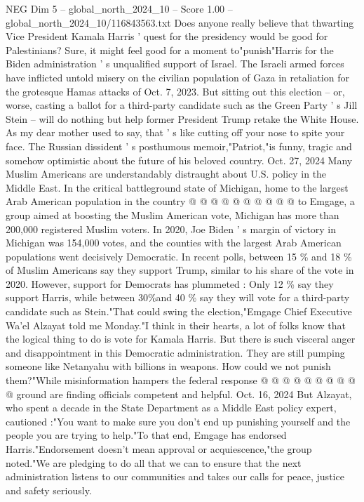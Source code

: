 \begin{textsample}{NEG Dim 5 – global\_north\_2024\_10 – Score 1.00 – global\_north\_2024\_10/116843563.txt}  \label{ex:f5_neg_046}
Does anyone really believe that thwarting Vice President Kamala Harris ' quest for the presidency would be good for Palestinians?
Sure, it might feel good for a moment to"punish"Harris for the Biden administration ' s unqualified support of Israel.
The Israeli armed forces have inflicted untold misery on the civilian population of Gaza in retaliation for the grotesque Hamas attacks of Oct. 7, 2023.
But sitting out this election -- or, worse, casting a ballot for a third-party candidate such as the Green Party ' s Jill Stein -- will do nothing but help former President Trump retake the White House.
As my dear mother used to say, that ' s like cutting off your nose to spite your face.
The Russian dissident ' s posthumous memoir,"Patriot,"is funny, tragic and somehow optimistic about the future of his beloved country.
Oct. 27, 2024 Many Muslim Americans are understandably distraught about U.S. policy in the Middle East.
In the critical battleground state of Michigan, home to the largest Arab American population in the country @ @ @ @ @ @ @ @ @ @ to Emgage, a group aimed at boosting the Muslim American vote, Michigan has more than 200,000 registered Muslim voters.
In 2020, Joe Biden ' s margin of victory in Michigan was 154,000 votes, and the counties with the largest Arab American populations went decisively Democratic.
In recent polls, between 15 \% and 18 \% of Muslim Americans say they support Trump, similar to his share of the vote in 2020.
However, support for Democrats has plummeted : Only 12 \% say they support Harris, while between 30\%and 40 \% say they will vote for a third-party candidate such as Stein."That could swing the election,"Emgage Chief Executive Wa'el Alzayat told me Monday."I think in their hearts, a lot of folks know that the logical thing to do is vote for Kamala Harris.
But there is such visceral anger and disappointment in this Democratic administration.
They are still pumping someone like Netanyahu with billions in weapons.
How could we not punish them?"While misinformation hampers the federal response @ @ @ @ @ @ @ @ @ @ ground are finding officials competent and helpful.
Oct. 16, 2024 But Alzayat, who spent a decade in the State Department as a Middle East policy expert, cautioned :"You want to make sure you don't end up punishing yourself and the people you are trying to help."To that end, Emgage has endorsed Harris."Endorsement doesn't mean approval or acquiescence,"the group noted."We are pledging to do all that we can to ensure that the next administration listens to our communities and takes our calls for peace, justice and safety seriously.

\end{textsample}
